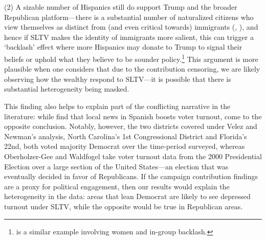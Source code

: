 \documentclass[11pt]{article}
\begin{document}
(2) A sizable number of Hispanics still do support Trump and the broader Republican platform---there is a substantial number of naturalized citizens who view themselves as distinct from (and even critical towards) immigrants (\cite{ramos_latino_2020}, \cite{navarette_millions_2019}), and hence if SLTV makes the identity of immigrants more salient, this can trigger a `backlash' effect where more Hispanics may donate to Trump to signal their beliefs or uphold what they believe to be sounder policy.\footnote{ \cite{fortin_gender_2015} is a similar example involving women and in-group backlash.}  This argument is more plausible when one considers that due to the contribution censoring, we are likely observing how the wealthy respond to SLTV---it is possible that there is substantial heterogeneity being masked.

This finding also helps to explain part of the conflicting narrative in the literature: while \cite{oberholzer-gee_media_2009} find that local news in Spanish boosts voter turnout, \cite{velez_tuning_2019} come to the opposite conclusion. Notably, however, the two districts covered under Velez and Newman's analysis, North Carolina's 1st Congressional District and Florida's 22nd, both voted majority Democrat over the time-period surveyed, whereas Oberholzer-Gee and Waldfogel take voter turnout data from the 2000 Presidential Election over a large section of the United States---an election that was eventually decided in favor of Republicans. If the campaign contribution findings are a proxy for political engagement, then our results would explain the heterogeneity in the data: areas that lean Democrat are likely to see depressed turnout under SLTV, while the opposite would be true in Republican areas. 


\end{document}
